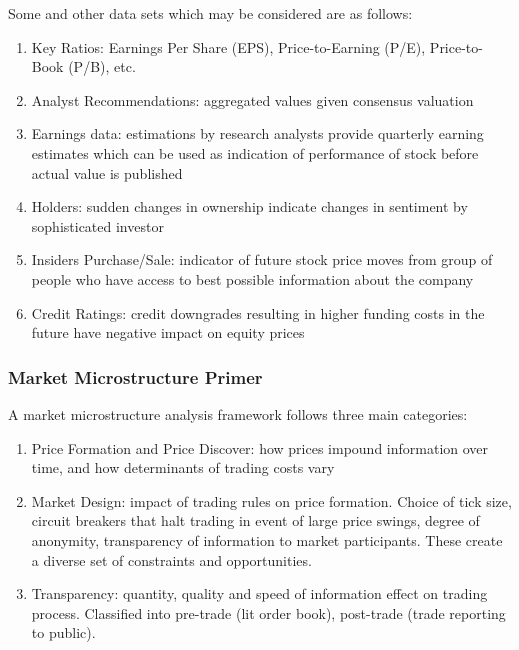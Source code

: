 Some  and other data sets which may be considered are as follows:
\begin{enumerate}[label=\roman*.]
\setlength{\itemsep}{0pt}
\item Key Ratios: Earnings Per Share (EPS), Price-to-Earning (P/E), Price-to-Book (P/B), etc. 
\item Analyst Recommendations: aggregated values given consensus valuation
\item Earnings data: estimations by research analysts provide quarterly earning estimates which can be used as indication of performance of stock before actual value is published
\item Holders: sudden changes in ownership indicate changes in sentiment by sophisticated investor
\item Insiders Purchase/Sale: indicator of future stock price moves from group of people who have access to best possible information about the company
\item Credit Ratings: credit downgrades resulting in higher funding costs in the future have negative impact on equity prices
\end{enumerate}

\subsubsection{Market Microstructure Primer}

A market microstructure analysis framework follows three main categories:
\begin{enumerate}[label=\roman*.]
\setlength{\itemsep}{0pt}
\item Price Formation and Price Discover: how prices impound information over time, and how determinants of trading costs vary
\item Market Design: impact of trading rules on price formation. Choice of tick size, circuit breakers that halt trading in event of large price swings, degree of anonymity, transparency of information to market participants. These create a diverse set of constraints and opportunities.
\item Transparency: quantity, quality and speed of information effect on trading process. Classified into pre-trade (lit order book), post-trade (trade reporting to public). 
\end{enumerate}


